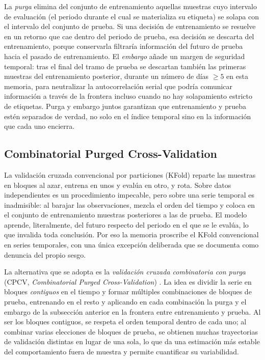 La \emph{purga} elimina del conjunto de entrenamiento aquellas muestras cuyo intervalo de evaluación (el periodo durante el cual se materializa su etiqueta) se solapa con el intervalo del conjunto de prueba. Si una decisión de entrenamiento se resuelve en un retorno que cae dentro del periodo de prueba, esa decisión se descarta del entrenamiento, porque conservarla filtraría información del futuro de prueba hacia el pasado de entrenamiento. El \emph{embargo} añade un margen de seguridad temporal: tras el final del tramo de prueba se descartan también las primeras muestras del entrenamiento posterior, durante un número de días $\ge 5$ en esta memoria, para neutralizar la autocorrelación serial que podría comunicar información a través de la frontera incluso cuando no hay solapamiento estricto de etiquetas. Purga y embargo juntos garantizan que entrenamiento y prueba estén separados de verdad, no solo en el índice temporal sino en la información que cada uno encierra.

\subsection{Combinatorial Purged Cross-Validation}
\label{sec:cpcv-cpcv}

La validación cruzada convencional por particiones (KFold) reparte las muestras en bloques al azar, entrena en unos y evalúa en otro, y rota. Sobre datos independientes es un procedimiento impecable, pero sobre una serie temporal es inadmisible: al barajar las observaciones, mezcla el orden del tiempo y coloca en el conjunto de entrenamiento muestras posteriores a las de prueba. El modelo aprende, literalmente, del futuro respecto del periodo en el que se le evalúa, lo que invalida toda conclusión. Por eso la memoria proscribe el KFold convencional en series temporales, con una única excepción deliberada que se documenta como denuncia del propio sesgo.

La alternativa que se adopta es la \emph{validación cruzada combinatoria con purga} (CPCV, \emph{Combinatorial Purged Cross-Validation}) \cite{lopezdeprado2018}. La idea es dividir la serie en bloques \emph{contiguos} en el tiempo y formar múltiples combinaciones de bloques de prueba, entrenando en el resto y aplicando en cada combinación la purga y el embargo de la subsección anterior en la frontera entre entrenamiento y prueba. Al ser los bloques contiguos, se respeta el orden temporal dentro de cada uno; al combinar varias elecciones de bloques de prueba, se obtienen muchas trayectorias de validación distintas en lugar de una sola, lo que da una estimación más estable del comportamiento fuera de muestra y permite cuantificar su variabilidad.

